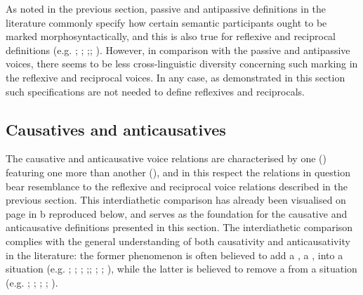 As noted in the previous section, passive and antipassive definitions in the literature commonly specify how certain semantic participants ought to be marked morphosyntactically, and this is also true for reflexive and reciprocal definitions (e.g. \citealt[11]{dixon:aikhenvald:2000}; \citealt[16]{melchuk:1993}; \citealt[95ff.]{givon:2001b};; \citealt[384f.]{kulikov:2010}). However, in comparison with the passive and antipassive voices, there seems to be less cross-linguistic diversity concerning such marking in the reflexive and reciprocal voices. In any case, as demonstrated in this section such specifications are not needed to define reflexives and reciprocals.

\subsection{Causatives and anticausatives} \label{def:causatives-anticausatives}
The causative and anticausative voice relations are characterised by one  () featuring one  more than another  (), and in this respect the relations in question bear resemblance to the reflexive and reciprocal voice relations described in the previous section. This interdiathetic comparison has already been visualised on page \pageref{fig:ch2:diathetic-relations} in b reproduced below, and serves as the foundation for the causative and anticausative definitions presented in this section. The interdiathetic comparison complies with the general understanding of both causativity and anticausativity in the literature: the former phenomenon is often believed to add a , a , into a situation (e.g. \citealt[11]{melchuk:1993}; \citealt[30ff.]{dixon:2000}; \citealt[13]{dixon:aikhenvald:2000}; \citealt[1136f.]{haspelmath:muller-bardey:2004};; \citealt[386]{kulikov:2010}; \citealt[96, 122]{malchukov:2015}; \citeyear[412]{malchukov:2017}), while the latter is believed to remove a  from a situation (e.g. \citealt[11]{melchuk:1993}; \citealt[7]{dixon:aikhenvald:2000}; \citealt[1132]{haspelmath:muller-bardey:2004}; \citealt[392]{kulikov:2010}; \citealt[90, 96f.]{malchukov:2015}).

